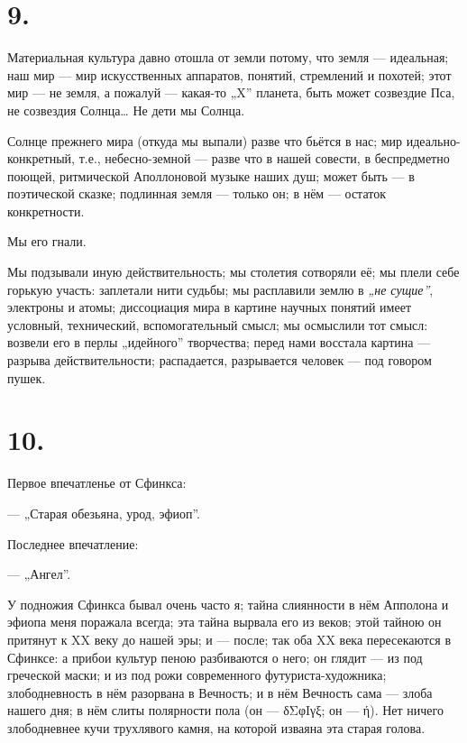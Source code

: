 \documentclass[12pt,a4paper,oneside]{book}
\begin{document}
\section*{9.}

Материальная культура давно отошла от земли потому, что земля — идеальная; наш мир — мир искусственных аппаратов, понятий, стремлений и похотей; этот мир — не земля, а пожалуй — какая-то „X” планета, быть может созвездие Пса, не созвездия Солнца… Не дети мы Солнца.

Солнце прежнего мира (откуда мы выпали) разве что бьётся в нас; мир идеально-конкретный, т.е., небесно-земной — разве что в нашей совести, в беспредметно поющей, ритмической Аполлоновой музыке наших душ; может быть — в поэтической сказке; подлинная земля — только он; в нём — остаток конкретности.

Мы его гнали.

Мы подзывали иную действительность; мы столетия сотворяли её; мы плели себе горькую участь: заплетали нити судьбы; мы расплавили землю в \emph{„не сущие”}, электроны и атомы; диссоциация мира в картине научных понятий имеет условный, технический, вспомогательный смысл; мы осмыслили тот смысл: возвели его в перлы „идейного” творчества; перед нами восстала картина — разрыва действительности; распадается, разрывается человек — под говором пушек.

\section*{10.}

Первое впечатленье от Сфинкса:

— „Старая обезьяна, урод, эфиоп”.

Последнее впечатление:

— „Ангел”.

У подножия Сфинкса бывал очень часто я; тайна слиянности в нём Апполона и эфиопа меня поражала всегда; эта тайна вырвала его из веков; этой тайною он притянут к XX веку до нашей эры; и — после; так оба XX века пересекаются в Сфинксе: а прибои культур пеною разбиваются о него; он глядит — из под греческой маски; и из под рожи современного футуриста-художника; злободневность в нём разорвана в Вечность; и в нём Вечность сама — злоба нашего дня; в нём слиты полярности пола (он — δΣφΙγξ; он — ή). Нет ничего злободневнее кучи трухлявого камня, на которой изваяна эта старая голова.
\end{document}
